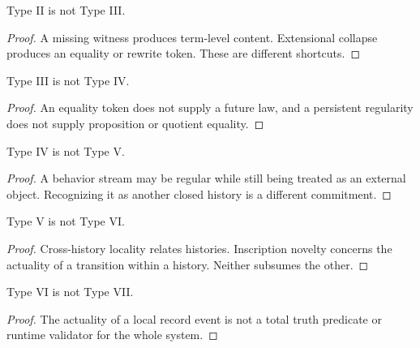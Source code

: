 
\begin{corollary}
\label{cor:philosophy-choice-not-extensional-identity}
Type II is not Type III.
\end{corollary}
\begin{proof}
A missing witness produces term-level content. Extensional collapse
produces an equality or rewrite token. These are different shortcuts.
\end{proof}

\begin{corollary}
\label{cor:philosophy-identity-not-causal-continuity}
Type III is not Type IV.
\end{corollary}
\begin{proof}
An equality token does not supply a future law, and a persistent
regularity does not supply proposition or quotient equality.
\end{proof}

\begin{corollary}
\label{cor:philosophy-causality-not-other-history}
Type IV is not Type V.
\end{corollary}
\begin{proof}
A behavior stream may be regular while still being treated as an
external object. Recognizing it as another closed history is a
different commitment.
\end{proof}

\begin{corollary}
\label{cor:philosophy-other-history-not-inscription-novelty}
Type V is not Type VI.
\end{corollary}
\begin{proof}
Cross-history locality relates histories. Inscription novelty concerns
the actuality of a transition within a history. Neither subsumes the
other.
\end{proof}

\begin{corollary}
\label{cor:philosophy-inscription-novelty-not-self-truth}
Type VI is not Type VII.
\end{corollary}
\begin{proof}
The actuality of a local record event is not a total truth predicate or
runtime validator for the whole system.
\end{proof}

